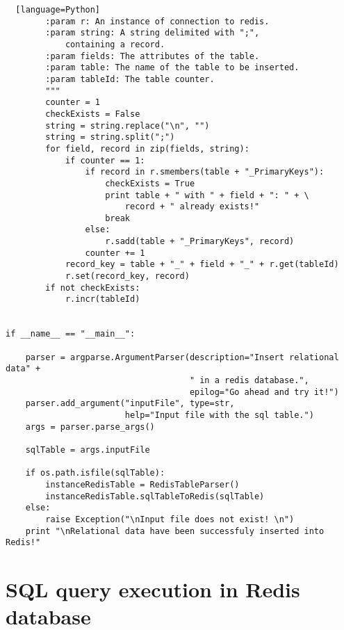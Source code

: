 \documentclass[11pt]{article}
\begin{document}
\begin{lstlisting}  [language=Python]
        :param r: An instance of connection to redis.
        :param string: A string delimited with ";",
            containing a record.
        :param fields: The attributes of the table.
        :param table: The name of the table to be inserted.
        :param tableId: The table counter.
        """
        counter = 1
        checkExists = False
        string = string.replace("\n", "")
        string = string.split(";")
        for field, record in zip(fields, string):
            if counter == 1:
                if record in r.smembers(table + "_PrimaryKeys"):
                    checkExists = True
                    print table + " with " + field + ": " + \
                        record + " already exists!"
                    break
                else:
                    r.sadd(table + "_PrimaryKeys", record)
                counter += 1
            record_key = table + "_" + field + "_" + r.get(tableId)
            r.set(record_key, record)
        if not checkExists:
            r.incr(tableId)


if __name__ == "__main__":

    parser = argparse.ArgumentParser(description="Insert relational data" +
                                     " in a redis database.",
                                     epilog="Go ahead and try it!")
    parser.add_argument("inputFile", type=str,
                        help="Input file with the sql table.")
    args = parser.parse_args()

    sqlTable = args.inputFile

    if os.path.isfile(sqlTable):
        instanceRedisTable = RedisTableParser()
        instanceRedisTable.sqlTableToRedis(sqlTable)
    else:
        raise Exception("\nInput file does not exist! \n")
    print "\nRelational data have been successfuly inserted into Redis!"

\end{lstlisting}

    

\section{SQL query execution in Redis database}\label{sql-query-execution-in-redis-database}
\end{document}
